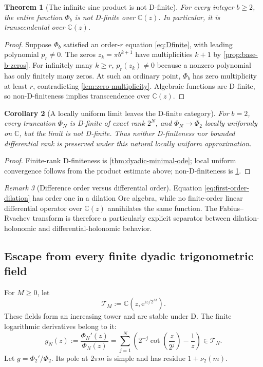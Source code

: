 \documentclass[11pt]{article}
\numberwithin{equation}{section}
\newtheorem{theorem}{Theorem}[section]
\newtheorem{corollary}[theorem]{Corollary}
\theoremstyle{definition}
\theoremstyle{remark}
\newtheorem{remark}[theorem]{Remark}
\newcommand{\C}{\mathbb C}
\newcommand{\ii}{\mathrm i}
\newcommand{\e}{\mathrm e}
\newcommand{\D}{\mathrm D}
\begin{document}
\begin{theorem}[The infinite sinc product is not D-finite]
\label{thm:Phi-not-Dfinite}
For every integer $b\ge2$, the entire function $\Phi_b$ is not D-finite over
$\C(z)$.  In particular, it is transcendental over $\C(z)$.
\end{theorem}
\begin{proof}
Suppose $\Phi_b$ satisfied an order-$r$ equation
\eqref{eq:Dfinite}, with leading polynomial $p_r\ne0$.  The zeros
$z_k=\pi b^{k+1}$ have multiplicities $k+1$ by
\cref{prop:base-b-zeros}.  For infinitely many $k\ge r$, $p_r(z_k)\ne0$
because a nonzero polynomial has only finitely many zeros.  At such an ordinary
point, $\Phi_b$ has zero multiplicity at least $r$, contradicting
\cref{lem:zero-multiplicity}.  Algebraic functions are D-finite, so
non-D-finiteness implies transcendence over $\C(z)$.
\end{proof}

\begin{corollary}[A locally uniform limit leaves the D-finite category]
\label{cor:Dfinite-limit-failure}
For $b=2$, every truncation $\Phi_N$ is D-finite of exact rank $2^N$, and
$\Phi_N\to\Phi_2$ locally uniformly on $\C$, but the limit is not D-finite.
Thus neither D-finiteness nor bounded differential rank is preserved under this
natural locally uniform approximation.
\end{corollary}
\begin{proof}
Finite-rank D-finiteness is \cref{thm:dyadic-minimal-ode}; local uniform
convergence follows from the product estimate above; non-D-finiteness is
\cref{thm:Phi-not-Dfinite}.
\end{proof}

\begin{remark}[Difference order versus differential order]
Equation \eqref{eq:first-order-dilation} has order one in a dilation Ore
algebra, while no finite-order linear differential operator over $\C(z)$
annihilates the same function.  The Fabius--Rvachev transform is therefore a
particularly explicit separator between dilation-holonomic and
differential-holonomic behavior.
\end{remark}

\subsection{Escape from every finite dyadic trigonometric field}

For $M\ge0$, let
\begin{equation}
 \mathcal T_M:=\C\!\left(z,\e^{\ii z/2^M}\right).
 \label{eq:trig-field}
\end{equation}
These fields form an increasing tower and are stable under $\D$.  The finite
logarithmic derivatives belong to it:
\begin{equation}
 g_N(z):=\frac{\Phi_N'(z)}{\Phi_N(z)}
 =\sum_{j=1}^{N}
 \left(2^{-j}\cot\!\left(\frac{z}{2^j}\right)-\frac1z\right)
 \in\mathcal T_N.
 \label{eq:finite-log-derivative}
\end{equation}
Let $g=\Phi_2'/\Phi_2$.  Its pole at $2\pi m$ is simple and has residue
$1+\nu_2(m)$.
\end{document}

